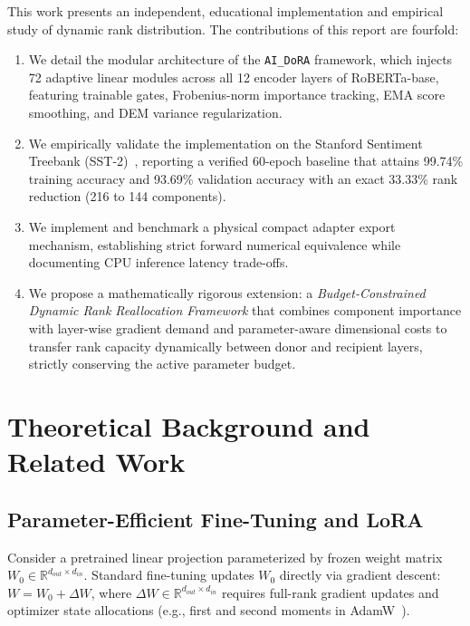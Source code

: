 \documentclass[conference]{IEEEtran}
\begin{document}
This work presents an independent, educational implementation and empirical study of dynamic rank distribution. The contributions of this report are fourfold:
\begin{enumerate}
  \item We detail the modular architecture of the \texttt{AI\_DoRA} framework, which injects 72 adaptive linear modules across all 12 encoder layers of RoBERTa-base, featuring trainable gates, Frobenius-norm importance tracking, EMA score smoothing, and DEM variance regularization.
  \item We empirically validate the implementation on the Stanford Sentiment Treebank (SST-2)~\cite{socher2013recursive,wang2018glue}, reporting a verified 60-epoch baseline that attains 99.74\% training accuracy and 93.69\% validation accuracy with an exact 33.33\% rank reduction (216 to 144 components).
  \item We implement and benchmark a physical compact adapter export mechanism, establishing strict forward numerical equivalence while documenting CPU inference latency trade-offs.
  \item We propose a mathematically rigorous extension: a \textit{Budget-Constrained Dynamic Rank Reallocation Framework} that combines component importance with layer-wise gradient demand and parameter-aware dimensional costs to transfer rank capacity dynamically between donor and recipient layers, strictly conserving the active parameter budget.
\end{enumerate}

\section{Theoretical Background and Related Work}
\label{sec:background}

\subsection{Parameter-Efficient Fine-Tuning and LoRA}
Consider a pretrained linear projection parameterized by frozen weight matrix $W_0 \in \mathbb{R}^{d_{out} \times d_{in}}$. Standard fine-tuning updates $W_0$ directly via gradient descent: $W = W_0 + \Delta W$, where $\Delta W \in \mathbb{R}^{d_{out} \times d_{in}}$ requires full-rank gradient updates and optimizer state allocations (e.g., first and second moments in AdamW~\cite{loshchilov2019adamw}).
\end{document}
